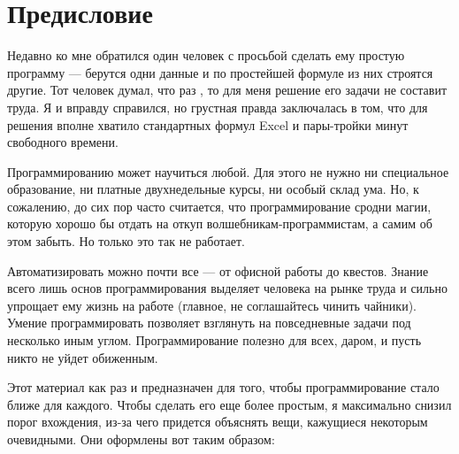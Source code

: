 \documentclass[book.tex]{subfiles}
\begin{document}



\maketitle %

\section*{Предисловие}

Недавно ко мне обратился один человек с просьбой сделать ему простую программу --- берутся одни данные и по простейшей формуле из них строятся другие. Тот человек думал, что раз \grqq, то для меня решение его задачи не составит труда. Я и вправду справился, но грустная правда заключалась в том, что для решения вполне хватило стандартных формул Excel и пары-тройки минут свободного времени.

Программированию может научиться любой. Для этого не нужно ни специальное образование, ни платные двухнедельные курсы, ни особый склад ума. Но, к сожалению, до сих пор часто считается, что программирование сродни магии, которую хорошо бы отдать на откуп волшебникам-программистам, а самим об этом забыть. Но только это так не работает. 

Автоматизировать можно почти все --- от офисной работы до квестов. Знание всего лишь основ программирования выделяет человека на рынке труда и сильно упрощает ему жизнь на работе (главное, не соглашайтесь чинить чайники). Умение программировать позволяет взглянуть на повседневные задачи под несколько иным углом. Программирование полезно для всех, даром, и пусть никто не уйдет обиженным.

Этот материал как раз и предназначен для того, чтобы программирование стало ближе для каждого. Чтобы сделать его еще более простым, я максимально снизил порог вхождения, из-за чего придется объяснять вещи, кажущиеся некоторым очевидными. Они оформлены вот таким образом:

\end{document}
